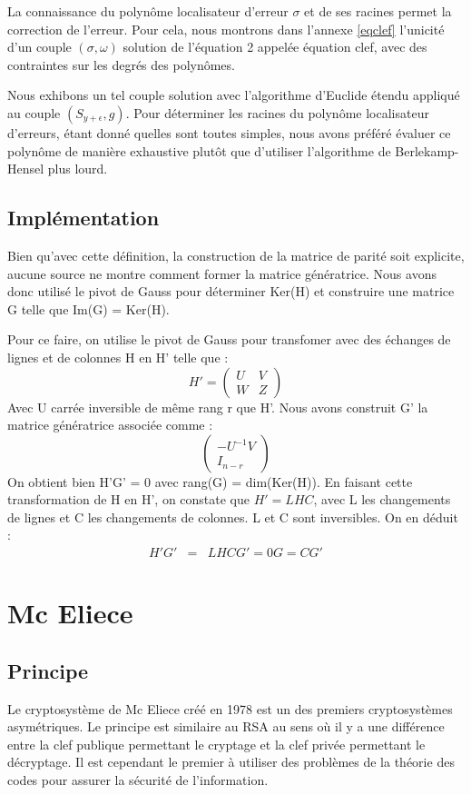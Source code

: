 \documentclass{article}
\begin{document}
			La connaissance du polynôme localisateur d'erreur $\sigma$ et de ses racines permet la correction de l'erreur.
			Pour cela, nous montrons dans l'annexe \ref{eqclef} l'unicité d'un couple $ (\sigma,\omega) $ solution de l'équation 2 appelée équation clef, avec des contraintes sur les degrés des polynômes.

			Nous exhibons un tel couple solution avec l'algorithme d'Euclide étendu appliqué au couple $ (S_{y+\epsilon},g) $.
			Pour déterminer les racines du polynôme localisateur d'erreurs, étant donné quelles sont toutes simples, nous avons préféré évaluer ce polynôme de manière exhaustive plutôt que d'utiliser l'algorithme de Berlekamp-Hensel plus lourd.

		\subsection*{Implémentation}

			Bien qu'avec cette définition, la construction de la matrice de parité soit explicite, aucune source ne montre comment former la matrice génératrice.
			Nous avons donc utilisé le pivot de Gauss pour déterminer Ker(H) et construire une matrice G telle que Im(G) = Ker(H).

			Pour ce faire, on utilise le pivot de Gauss pour transfomer avec des échanges de lignes et de colonnes H en H' telle que :
			$$ H' = 
			\begin{pmatrix}
				U & V \\
				W & Z
			\end{pmatrix}
			$$
			Avec U carrée inversible de même rang r que H'.
			Nous avons construit G' la matrice génératrice associée comme :
			$$
			\begin{pmatrix}
				-U^{-1}V \\
				I_{n-r}
			\end{pmatrix}
			$$
			On obtient bien H'G' = 0 avec rang(G) = dim(Ker(H)).
			En faisant cette transformation de H en H', on constate que $H' = LHC$, avec L les changements de lignes et C les changements de colonnes.
			L et C sont inversibles.
			On en déduit :
			\begin{eqnarray*}
				H'G' &=& LHCG' = 0
				G = CG'
			\end{eqnarray*}


	\section{Mc Eliece}

		\subsection*{Principe}
			Le cryptosystème de Mc Eliece créé en 1978 est un des premiers cryptosystèmes asymétriques.
			Le principe est similaire au RSA au sens où il y a une différence entre la clef publique permettant le cryptage et la clef privée permettant le décryptage.
			Il est cependant le premier à utiliser des problèmes de la théorie des codes pour assurer la sécurité de l'information.
\end{document}
